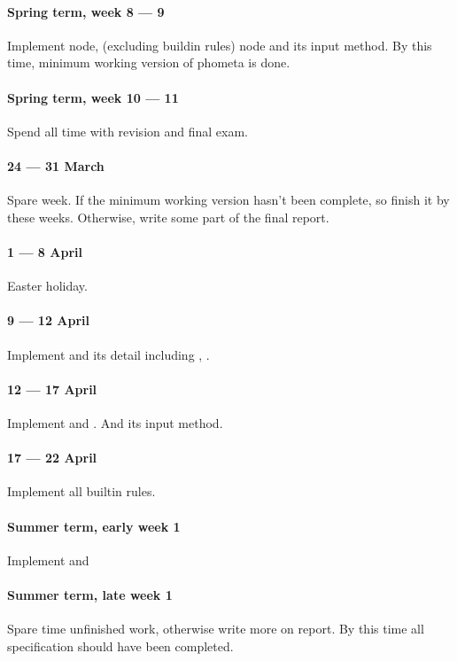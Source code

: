 \paragraph{Spring term, week 8 --- 9} Implement \kInference \kRule node, \kTheorem (excluding buildin rules) node and its input method. By this time, minimum working version of phometa is done.

\paragraph{Spring term, week 10 --- 11} Spend all time with revision and final exam.

\paragraph{24 --- 31 March} Spare week. If the minimum working version hasn't been complete, so finish it by these weeks. Otherwise, write some part of the final report.

\paragraph{1 --- 8 April} Easter holiday.

\paragraph{9 --- 12 April} Implement \kDefinition and its detail including \kMatch, \kLet \kBe.

\paragraph{12 --- 17 April} Implement \kSequence and \kLiteral \kGrammar. And its input method.

\paragraph{17 --- 22 April} Implement all builtin rules.

\paragraph{Summer term, early week 1} Implement \kCompound \kRule and \kAlias

\paragraph{Summer term, late week 1} Spare time unfinished work, otherwise write more on report. By this time all specification should have been completed.

